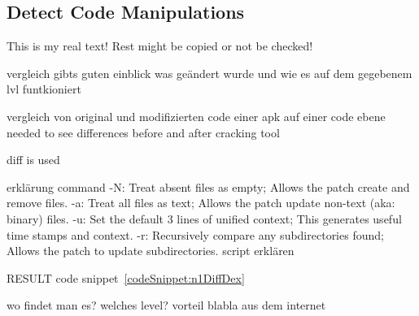 \subsection{Detect Code Manipulations} \label{subsection:forensics-tools-diff}
This is my real text! Rest might be copied or not be checked!


vergleich gibts guten einblick was geändert wurde und wie es auf dem gegebenem lvl funtkioniert\newline

vergleich von original und modifizierten code einer apk auf einer code ebene\newline
needed to see differences before and after cracking tool\newline

diff is used\newline




erklärung command \cite{diffUbuntu}
-N: Treat absent files as empty; Allows the patch create and remove files.\newline
-a: Treat all files as text; Allows the patch update non-text (aka: binary) files.\newline
-u: Set the default 3 lines of unified context; This generates useful time stamps and context.\newline
-r: Recursively compare any subdirectories found; Allows the patch to update subdirectories.\newline
script erklären\newline

RESULT code snippet~\ref{codeSnippet:n1DiffDex}

wo findet man es?\newline
welches level?\newline
vorteil\newline
blabla aus dem internet\newline
